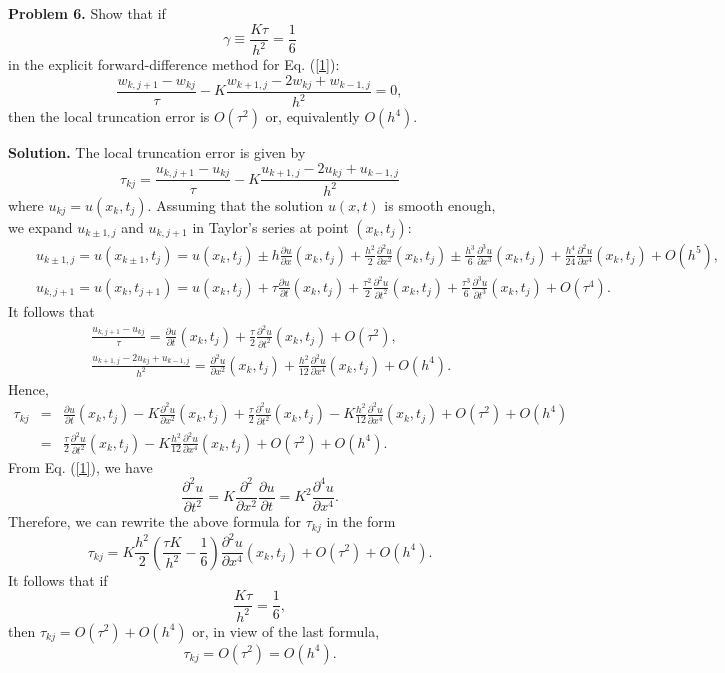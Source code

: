 \documentclass[10pt]{article}
\def\pr{{\partial}}
\begin{document}

\vskip 0.5cm
\noindent
{\bf Problem 6.} Show that if
\[
\gamma\equiv\frac{K\tau}{h^2}=\frac{1}{6}
\]
in the explicit forward-difference method for Eq. (\ref{1}):
\[
\frac{w_{k,j+1}-w_{kj}}{\tau}-K
\frac{w_{k+1, j}-2w_{kj}+w_{k-1,j}}{h^{2}}=0,
\]
then the local truncation error is $O(\tau^2)$ or, equivalently $O(h^4)$.


\vskip 0.5cm \noindent
{\bf Solution.} The local truncation error is given by
\begin{equation}
\tau_{kj}=\frac{u_{k,j+1}-u_{kj}}{\tau}-K \frac{u_{k+1,
j}-2u_{kj}+u_{k-1,j}}{h^{2}}  \label{s5}
\end{equation}
where $u_{kj}=u(x_{k},t_{j})$. Assuming that the
solution $u(x,t)$ is smooth enough, we expand $u_{k\pm 1,j}$ and
$u_{k,j+1}$ in Taylor's series at point $(x_{k},t_{j})$:
\begin{eqnarray}
&&u_{k\pm 1,j}=u(x_{k\pm 1},t_{j})=u(x_{k},t_{j})\pm h\frac{\pr
u}{\pr x}(x_{k},t_{j}) + \frac{h^{2}}{2}\frac{\pr^{2} u}{\pr
x^{2}}(x_{k},t_{j})\pm
\frac{h^{3}}{6}\frac{\pr^{3} u}{\pr x^{3}}(x_{k},t_{j})
+ \frac{h^{4}}{24}\frac{\pr^{2} u}{\pr x^{4}}(x_{k},t_{j})+O(h^{5}), \nonumber \\
&&u_{k,j+ 1}=u(x_{k},t_{j+1})=u(x_{k},t_{j})+
\tau\frac{\pr u}{\pr t}(x_{k},t_{j}) + \frac{\tau^{2}}{2}\frac{\pr^{2}
u}{\pr t^{2}}(x_{k},t_{j})+ \frac{\tau^{3}}{6}\frac{\pr^{3} u}{\pr
t^{3}}(x_{k},t_{j}) +O(\tau^{4}). \nonumber
\end{eqnarray}
It follows that
\begin{eqnarray}
&&\frac{u_{k,j+1}-u_{kj}}{\tau}=
\frac{\pr u}{\pr t}(x_{k},t_{j}) + \frac{\tau}{2}\frac{\pr^{2}
u}{\pr t^{2}}(x_{k},t_{j})+ O(\tau^{2}), \nonumber \\
&&\frac{u_{k+1, j}-2u_{kj}+u_{k-1,j}}{h^{2}}=
\frac{\pr^{2} u}{\pr x^{2}}(x_{k},t_{j})
+ \frac{h^{2}}{12}\frac{\pr^{2} u}{\pr x^{4}}(x_{k},t_{j})+O(h^{4}). \nonumber
\end{eqnarray}
Hence,
\begin{eqnarray}
\tau_{kj}&=&
\frac{\pr u}{\pr t}(x_{k},t_{j})-K\frac{\pr^{2} u}{\pr x^{2}}(x_{k},t_{j})
+ \frac{\tau}{2}\frac{\pr^{2}u}{\pr t^{2}}(x_{k},t_{j})
-K \frac{h^{2}}{12}\frac{\pr^{2} u}{\pr x^{4}}(x_{k},t_{j})
+ O(\tau^{2})+O(h^{4})  \nonumber \\
&=&\frac{\tau}{2}\frac{\pr^{2}u}{\pr t^{2}}(x_{k},t_{j})
-K \frac{h^{2}}{12}\frac{\pr^{2} u}{\pr x^{4}}(x_{k},t_{j})
+ O(\tau^{2})+O(h^{4}).
\end{eqnarray}
From Eq. (\ref{1}), we have
\[
\frac{\pr^{2}u}{\pr t^{2}}=K\frac{\pr^{2} }{\pr x^{2}}
\frac{\pr u}{\pr t}=K^2\frac{\pr^{4} u}{\pr x^{4}}.
\]
Therefore, we can rewrite the above formula for $\tau_{kj}$ in the form
\[
\tau_{kj}=
K\frac{h^{2}}{2}\left(\frac{\tau K}{h^2}-\frac{1}{6}\right)
\frac{\pr^{2} u}{\pr x^{4}}(x_{k},t_{j})
+ O(\tau^{2})+O(h^{4}).
\]
It follows that if
\[
\frac{K\tau}{h^2}=\frac{1}{6},
\]
then $\tau_{kj}=O(\tau^{2})+O(h^{4})$ or, in view of the last formula,
\[
\tau_{kj}=O(\tau^{2})=O(h^{4}).
\]
\end{document}
